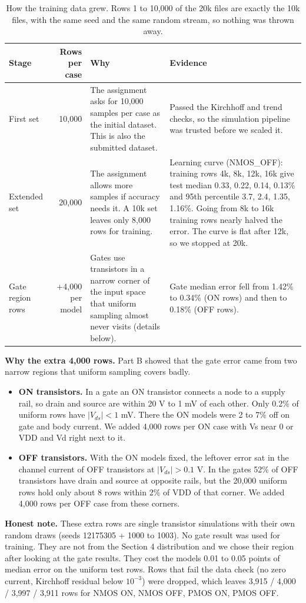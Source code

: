 \documentclass[10pt,a4paper]{article}
\begin{document}
\begin{table}[H]
\centering\small
\begin{tabularx}{\linewidth}{@{}lrXX@{}}
\toprule
Stage & Rows per case & Why & Evidence\\
\midrule
First set & 10,000 & The assignment asks for 10,000 samples per case as the initial dataset. This is also the submitted dataset. & Passed the Kirchhoff and trend checks, so the simulation pipeline was trusted before we scaled it.\\
Extended set & 20,000 & The assignment allows more samples if accuracy needs it. A 10k set leaves only 8,000 rows for training. & Learning curve (NMOS\_OFF): training rows 4k, 8k, 12k, 16k give test median 0.33, 0.22, 0.14, 0.13\% and 95th percentile 3.7, 2.4, 1.35, 1.16\%. Going from 8k to 16k training rows nearly halved the error. The curve is flat after 12k, so we stopped at 20k.\\
Gate region rows & +4,000 per model & Gates use transistors in a narrow corner of the input space that uniform sampling almost never visits (details below). & Gate median error fell from 1.42\% to 0.34\% (ON rows) and then to 0.18\% (OFF rows).\\
\bottomrule
\end{tabularx}
\caption{How the training data grew. Rows 1 to 10,000 of the 20k files are exactly the 10k files, with the same seed and the same random stream, so nothing was thrown away.}\label{tab:growth}
\end{table}

\textbf{Why the extra 4,000 rows.} Part B showed that the gate error came from two narrow regions that uniform sampling covers badly.
\begin{itemize}
\item \textbf{ON transistors.} In a gate an ON transistor connects a node to a supply rail, so drain and source are within 20 \textmu V to 1 mV of each other. Only 0.2\% of uniform rows have $|V_{ds}|<1$ mV. There the ON models were 2 to 7\% off on gate and body current. We added 4,000 rows per ON case with Vs near 0 or VDD and Vd right next to it.
\item \textbf{OFF transistors.} With the ON models fixed, the leftover error sat in the channel current of OFF transistors at $|V_{ds}|>0.1$ V. In the gates 52\% of OFF transistors have drain and source at opposite rails, but the 20,000 uniform rows hold only about 8 rows within 2\% of VDD of that corner. We added 4,000 rows per OFF case from these corners.
\end{itemize}
\textbf{Honest note.} These extra rows are single transistor simulations with their own random draws (seeds 12175305 + 1000 to 1003). No gate result was used for training. They are not from the Section 4 distribution and we chose their region after looking at the gate results. They cost the models 0.01 to 0.05 points of median error on the uniform test rows. Rows that fail the data check (no zero current, Kirchhoff residual below $10^{-3}$) were dropped, which leaves 3,915 / 4,000 / 3,997 / 3,911 rows for NMOS ON, NMOS OFF, PMOS ON, PMOS OFF.
\end{document}
